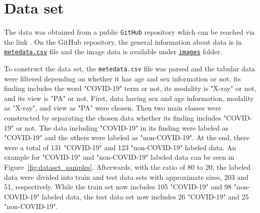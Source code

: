 \section{Data set}

The data was obtained from a public \texttt{GitHub} repository which can be reached via the link \textcolor{blue}{}. On the GitHub repository, the general information about data is in \href{https://github.com/ieee8023/covid-chestxray-dataset/blob/master/metadata.csv}{\texttt{metedata.csv}} file and the image data is available under \href{https://github.com/ieee8023/covid-chestxray-dataset/tree/master/images}{\texttt{images}} folder.

To construct the data set, the \texttt{metedata.csv} file was parsed and the tabular data were filtered depending on whether it has age and sex information or not, its finding includes the word "COVID-19" term or not, its modality is "X-ray" or not, and its view is "PA" or not. First, data having sex and age information, modality as "X-ray", and view as "PA" were chosen. Then two main classes were constructed by separating the chosen data whether its finding includes "COVID-19" or not. The data including "COVID-19" in its finding were labeled as "COVID-19" and the others were labeled as "non-COVID-19". At the end, there were a total of 131 "COVID-19" and 123 "non-COVID-19" labeled data. An example for "COVID-19" and "non-COVID-19" labeled data can be seen in Figure~\ref{fig:dataset_samples}. Afterwards, with the ratio of 80 to 20, the labeled data were divided into train and test data sets with approximate sizes, 203 and 51, respectively. While the train set now includes 105 "COVID-19" and 98 "non-COVID-19" labeled data, the test data set now includes 26 "COVID-19" and 25 "non-COVID-19".



